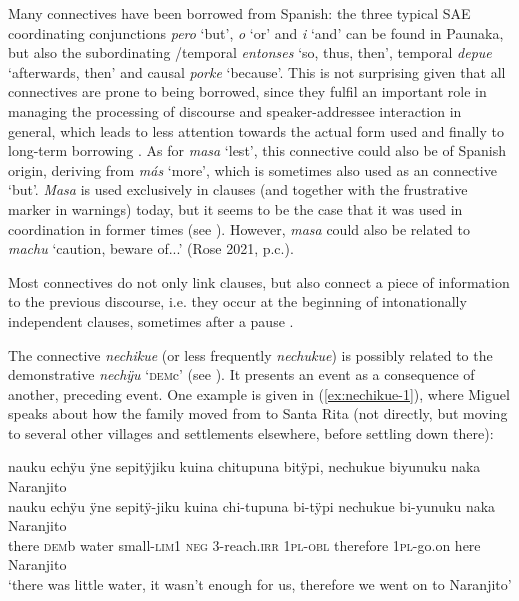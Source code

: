 Many connectives have been borrowed from Spanish: the three typical SAE coordinating conjunctions \textit{pero} ‘but’, \textit{o} ‘or’ and \textit{i} ‘and’ can be found in Paunaka, but also the subordinating /temporal \textit{entonses} ‘so, thus, then’, temporal \textit{depue} ‘afterwards, then’ and causal \textit{porke} ‘because’. This is not surprising given that all connectives are prone to being borrowed, since they fulfil an important role in managing the processing of discourse and speaker-addressee interaction in general, which leads to less attention towards the actual form used and finally to long-term borrowing \citep[194]{Matras2009}. As for \textit{masa} ‘lest’, this connective could also be of Spanish origin, deriving from \textit{más} ‘more’, which is sometimes also used as an  connective ‘but’. \textit{Masa} is used exclusively in  clauses (and together with the frustrative marker in warnings) today, but it seems to be the case that it was used in  coordination in former times (see ). However, \textit{masa} could also be related to  \textit{machu} ‘caution, beware of...’ (Rose 2021, p.c.).

Most connectives do not only link clauses, but also connect a piece of information to the previous discourse, i.e. they occur at the beginning of intonationally independent clauses, sometimes after a pause \citep[140--141]{DanielsenTerhart2015}.

\newpage
The connective \textit{nechikue} (or less frequently \textit{nechukue}) is possibly related to the demonstrative \textit{nechÿu} ‘\textsc{dem}c’ (see ). It presents an event as a consequence of another, preceding event. One example is given in (\ref{ex:nechikue-1}), where Miguel speaks about how the family moved from  to Santa Rita (not directly, but moving to several other villages and settlements elsewhere, before settling down there):

\ea\label{ex:nechikue-1}
\begingl
\glpreamble nauku echÿu ÿne sepitÿjiku kuina chitupuna bitÿpi, nechukue biyunuku naka \\Naranjito\\
\gla nauku echÿu ÿne sepitÿ-jiku kuina chi-tupuna bi-tÿpi nechukue bi-yunuku naka Naranjito\\
\glb there \textsc{dem}b water small-\textsc{lim}1 \textsc{neg} 3-reach.\textsc{irr} 1\textsc{pl}-\textsc{obl} therefore 1\textsc{pl}-go.on here Naranjito\\
\glft ‘there was little water, it wasn’t enough for us, therefore we went on to Naranjito’
\endgl
\trailingcitation{[mxx-p110825l.062-064]}
\xe

